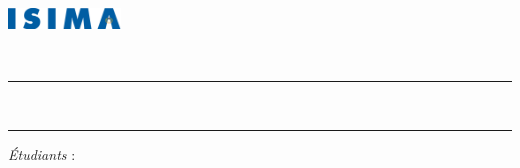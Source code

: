 \begin{titlepage}
\begin{center}
\singlespace

\begingroup
	\begin{flushleft}
		\includegraphics[width=30mm]{img/isima-logo}\\
		\ecole
	\end{flushleft}
\endgroup

\vspace{14em}

\begingroup
	\large
	\textsc{\titreRapport} \\
	\textsc{\filiere}
\endgroup

\vspace{1em}

\begingroup
	\large
	\color{Maroon}
    \rule{\textwidth}{2pt}\\[1em]
	\spacedallcaps{\sousTitreRapport}
	\rule{\textwidth}{2pt}
\endgroup

\vspace{14em}

\begingroup
	\begin{flushleft}
		\emph{Étudiants} : \noms \\[0.5em]
	\end{flushleft}
\endgroup

\end{center}
\end{titlepage}